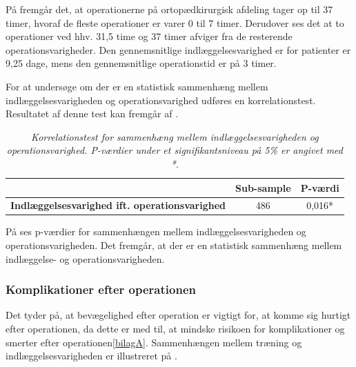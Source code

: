 \noindent
På  fremgår det, at operationerne på ortopædkirurgisk afdeling tager op til 37 timer, hvoraf de fleste operationer er varer 0 til 7 timer. Derudover ses det at to operationer ved hhv. 31,5 time og 37 timer afviger fra de resterende operationsvarigheder. Den gennemsnitlige indlæggelsesvarighed er for patienter er 9,25 dage, mens den gennemsnitlige operationstid er på 3 timer. 

For at undersøge om der er en statistisk sammenhæng mellem indlæggelsesvarigheden og operationsvarighed udføres en korrelationstest. Resultatet af denne test kan fremgår af .

\begin{table}[H]
\centering
\begin{tabular}{|c|c|c|}
\hline
\textbf{}                                             & \textbf{Sub-sample} & \textbf{P-værdi} \\ \hline
\textbf{Indlæggelsesvarighed ift. operationsvarighed} & 486                 & 0,016*           \\ \hline
\end{tabular}
\caption{\textit{Korrelationstest for sammenhæng mellem indlæggelsesvarigheden og operationsvarighed. P-værdier under et signifikantsniveau på 5\% er angivet med *.}}
\label{opogindlaegtab}
\end{table}

\noindent
På  ses p-værdier for sammenhængen mellem indlæggelsesvarigheden og operationsvarigheden. Det fremgår, at der er en statistisk sammenhæng mellem indlæggelse- og operationsvarigheden. 

\subsubsection{Komplikationer efter operationen}
Det tyder på, at bevægelighed efter operation er vigtigt for, at komme sig hurtigt efter operationen, da dette er med til, at mindske risikoen for komplikationer og smerter efter operationen\ref{bilagA}\cite{Nordjylland2014}. Sammenhængen mellem træning og indlæggelsesvarigheden er illustreret på .


